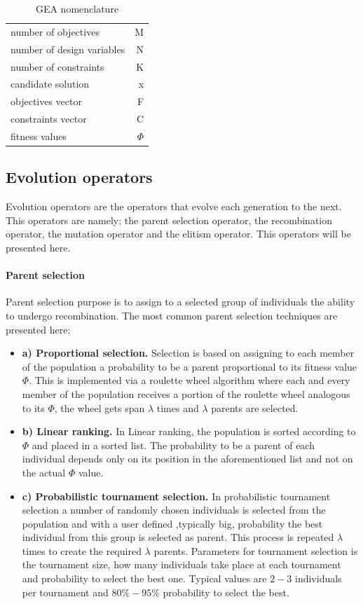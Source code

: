 \begin{table}[htdp]
\centering
\begin{tabular}{lr} 
\hline
\hline
number of objectives & M\\
number of design variables & N\\
number of constraints   & K\\
\hline
candidate solution   & x\\
objectives vector  & F\\
constraints vector  & C\\
fitness values & $\Phi$ \\
\hline
\hline
\end{tabular}
\caption[GEA nomenclature]{GEA nomenclature}
\label{GEA nomenclature} 
\end{table}


\subsection{Evolution operators}
Evolution operators are the operators that evolve each generation to the next. This operators are namely; the parent selection operator, the recombination operator, the mutation operator and the elitism operator. This operators will be presented here.
   
\paragraph{Parent selection}
Parent selection purpose is to assign to a selected group of individuals the ability to undergo recombination. The most common parent selection techniques are presented here; 
\begin{itemize}
\item[]{\bf a) Proportional selection.} Selection is based on assigning to each member of the population a probability to be a parent proportional to its fitness value $\Phi$. This is implemented via a roulette wheel algorithm where each and every member of the population receives a portion of the roulette wheel analogous to its $\Phi$, the wheel gets span $\lambda$ times and $\lambda$ parents are selected. 
\item[]{\bf b) Linear ranking.} In Linear ranking, the population is sorted according to $\Phi$ and placed in a sorted list. The probability to be a parent of each individual depends only on its position in the aforementioned list and not on the actual $\Phi$ value.
\item[]{\bf c) Probabilistic tournament selection.}
In probabilistic tournament selection \cite{goldberg1991} a number of randomly chosen individuals is selected from the population and with a user defined ,typically big, probability the best individual from this group is selected as parent. This process is repeated $\lambda$ times to create the required $\lambda$ parents. Parameters for tournament selection is the tournament size, how many individuals take place at each tournament and probability to select the best one. Typical values are $2-3$ individuals per tournament and $80\%-95\%$ probability to select the best.
\end{itemize}

